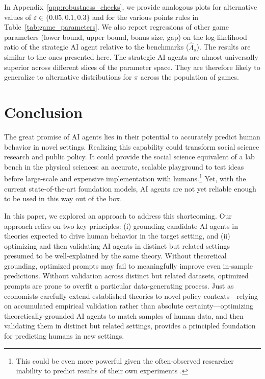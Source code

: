 \documentclass[11pt]{article}
\theoremstyle{definition}
\newcommand{\aisub}{AI agent}
\newcommand{\persona}{prompt}
\begin{document}
In Appendix~\ref{app:robustness_checks}, we provide analogous plots for alternative values of $\varepsilon \in \{0.05, 0.1, 0.3\}$ and for the various points rules in Table~\ref{tab:game_parameters}.
We also report regressions of other game parameters (lower bound, upper bound, bonus size, gap) on the log-likelihood ratio of the strategic \aisub{} relative to the benchmarks ($\hat \Lambda_s$).
The results are similar to the ones presented here.
The strategic \aisub{s} are almost universally superior across different slices of the parameter space.
They are therefore likely to generalize to alternative distributions for $\pi$ across the population of games.

\section{Conclusion}
\label{sec:conclusion}

The great promise of \aisub{s} lies in their potential to accurately predict human behavior in novel settings.
Realizing this capability could transform social science research and public policy.
It could provide the social science equivalent of a lab bench in the physical sciences: an accurate, scalable playground to test ideas before large-scale and expensive implementation with humans.\footnote{This could be even more powerful given the often-observed researcher inability to predict results of their own experiments \citep{predictscience2019DellaVigna,milkmanMegastudies2021,Gandhi2023Hypothetical,Gandhi2024EffectSize,Duckworth2025ZearnMega}.}
Yet, with the current state-of-the-art foundation models, \aisub{s} are not yet reliable enough to be used in this way out of the box.

In this paper, we explored an approach to address this shortcoming.
Our approach relies on two key principles: (i) grounding candidate \aisub{s} in theories expected to drive human behavior in the target setting, and (ii) optimizing and then validating \aisub{s} in distinct but related settings presumed to be well-explained by the same theory.
Without theoretical grounding, optimized \persona{s} may fail to meaningfully improve even in-sample predictions.
Without validation across distinct but related datasets, optimized \persona{s} are prone to overfit a particular data-generating process.
Just as economists carefully extend established theories to novel policy contexts---relying on accumulated empirical validation rather than absolute certainty---optimizing theoretically-grounded \aisub{s} to match samples of human data, and then validating them in distinct but related settings, provides a principled foundation for predicting humans in new settings.
\end{document}
